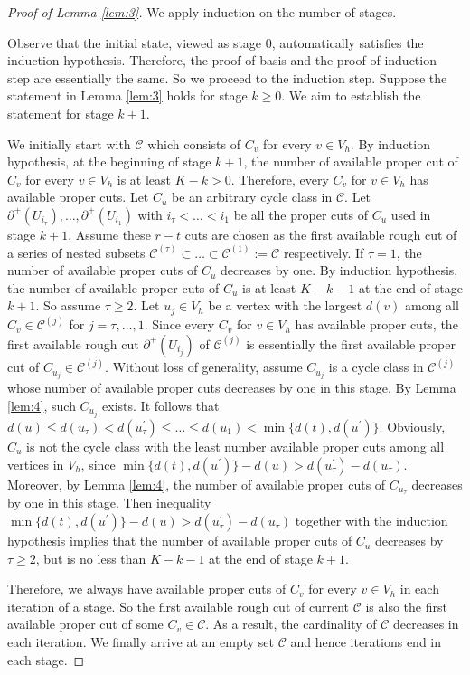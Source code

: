 \documentclass[11pt]{article}
\begin{document}
\begin{proof}[Proof of Lemma \ref{lem:3}]
We apply induction on the number of stages.

Observe that the initial state, viewed as stage 0, automatically satisfies the induction hypothesis. Therefore, the proof of basis and the proof of induction step are essentially the same. So we proceed to the induction step. Suppose the statement in Lemma \ref{lem:3} holds for stage $k\geq 0$. We aim to establish the statement for stage $k+1$.

We initially start with $\mathcal{C}$ which consists of $C_v$ for every $v\in V_h$. By induction hypothesis, at the beginning of stage $k+1$, the number of available proper cut of $C_v$ for every $v\in V_h$ is at least $K-k>0$. Therefore, every $C_v$ for $v\in V_h$ has available proper cuts. Let $C_u$ be an arbitrary cycle class in $\mathcal{C}$. Let $\partial^+(U_{i_\tau}),\dots,\partial^+(U_{i_1})$ with $i_\tau<\dots<i_1$ be all the proper cuts of $C_u$ used in stage $k+1$. Assume these $r-t$ cuts are chosen as the first available rough cut of a series of nested subsets $\mathcal{C}^{(\tau)}\subset\dots\subset\mathcal{C}^{(1)}:=\mathcal{C}$ respectively. If $\tau=1$, the number of available proper cuts of $C_u$ decreases by one. By induction hypothesis, the number of available proper cuts of $C_u$ is at least $K-k-1$ at the end of stage $k+1$. So assume $\tau\geq 2$. Let $u_j\in V_h$ be a vertex with the largest $d(v)$ among all $C_v\in \mathcal{C}^{(j)}$ for $j=\tau,\dots,1$. Since every $C_v$ for $v\in V_h$ has available proper cuts, the first available rough cut $\partial^+(U_{i_j})$ of $\mathcal{C}^{(j)}$ is essentially the first available proper cut of $C_{u_j}\in \mathcal{C}^{(j)}$. Without loss of generality, assume $C_{u_j}$ is a cycle class in $\mathcal{C}^{(j)}$ whose number of available proper cuts decreases by one in this stage. By Lemma \ref{lem:4}, such $C_{u_j}$ exists. It follows that $d(u)\leq d(u_\tau)< d(u^\prime_\tau)\leq\dots\leq d(u_1)< \min\{d(t),d(u^\prime)\}$. Obviously, $C_u$ is not the cycle class with the least number available proper cuts among all vertices in $V_h$, since $\min\{d(t),d(u^\prime)\}-d(u)> d(u_\tau^\prime)-d(u_\tau)$. Moreover, by Lemma \ref{lem:4}, the number of available proper cuts of $C_{u_\tau}$ decreases by one in this stage. Then inequality $\min\{d(t),d(u^\prime)\}-d(u)>d(u_\tau^\prime)-d(u_\tau)$ together with the induction hypothesis implies that the number of available proper cuts of $C_u$ decreases by $\tau\geq 2$, but is no less than $K-k-1$ at the end of stage $k+1$.

Therefore, we always have available proper cuts of $C_v$ for every $v\in V_h$ in each iteration of a stage. So the first available rough cut of current $\mathcal{C}$ is also the first available proper cut of some $C_v\in \mathcal{C}$. As a result, the cardinality of $\mathcal{C}$ decreases in each iteration. We finally arrive at an empty set $\mathcal{C}$ and hence iterations end in each stage.
\end{proof}
\end{document}

